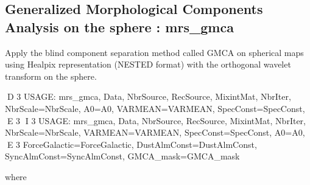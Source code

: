 \subsection{Generalized Morphological Components Analysis on the sphere : mrs\_gmca}
Apply the blind component separation method called GMCA on spherical maps using Healpix 
representation (NESTED format) with the orthogonal wavelet transform on the sphere.
{\bf
\begin{center}
D 3
     USAGE: mrs\_gmca, Data, NbrSource, RecSource, MixintMat, NbrIter, NbrScale=NbrScale, A0=A0, VARMEAN=VARMEAN, SpecConst=SpecConst, 
E 3
I 3
     USAGE: mrs\_gmca, Data, NbrSource, RecSource, MixintMat, NbrIter, NbrScale=NbrScale, VARMEAN=VARMEAN, SpecConst=SpecConst, A0=A0, 
E 3
     ForceGalactic=ForceGalactic, DustAlmConst=DustAlmConst, SyncAlmConst=SyncAlmConst, GMCA\_mask=GMCA\_mask
\end{center}}
where 

